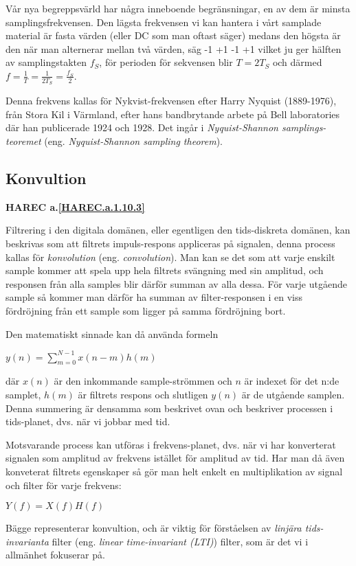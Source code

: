 \begin{rev-nytt}[MAD]

Vår nya begreppsvärld har några inneboende begränsningar, en av dem är minsta
samplingsfrekvensen. Den lägsta frekvensen vi kan hantera i vårt samplade
material är fasta värden (eller DC som man oftast säger) medans den högsta är
den när man alternerar mellan två värden, säg -1 +1 -1 +1 vilket ju ger
hälften av samplingstakten \(f_S\), för perioden för sekvensen blir
\(T = 2T_S\) och därmed \(f=\frac{1}{T}=\frac{1}{2T_S}=\frac{f_S}{2}\).

Denna frekvens kallas för Nykvist-frekvensen efter Harry Nyquist (1889-1976),
från Stora Kil i Värmland, efter hans bandbrytande arbete på Bell laboratories
där han publicerade 1924 och 1928. Det ingår i \emph{Nyquist-Shannon samplings-
teoremet} (eng. \emph{Nyquist-Shannon sampling theorem}).

\end{rev-nytt}

\subsection{Konvultion}
\textbf{HAREC a.\ref{HAREC.a.1.10.3}\label{myHAREC.a.1.10.3}}

\begin{rev-nytt}[MAD]

Filtrering i den digitala domänen, eller egentligen den tids-diskreta domänen,
kan beskrivas som att filtrets impuls-respons appliceras på signalen, denna
process kallas för \emph{konvolution} (eng. \emph{convolution}). Man kan se det
som att varje enskilt sample kommer att spela upp hela filtrets svängning med
sin amplitud, och responsen från alla samples blir därför summan av alla dessa.
För varje utgående sample så kommer man därför ha summan av filter-responsen
i en viss fördröjning från ett sample som ligger på samma fördröjning bort.

Den matematiskt sinnade kan då använda formeln

\(y(n) = \sum_{m=0}^{N-1} x(n-m)h(m)\)

där \(x(n)\) är den inkommande sample-strömmen och \(n\) är indexet för det
n:de samplet, \(h(m)\) är filtrets respons och slutligen \(y(n)\) är de utgående
samplen. Denna summering är densamma som beskrivet ovan och beskriver processen
i tids-planet, dvs. när vi jobbar med tid.

Motsvarande process kan utföras i frekvens-planet, dvs. när vi har konverterat
signalen som amplitud av frekvens istället för amplitud av tid. Har man då
även konveterat filtrets egenskaper så gör man helt enkelt en multiplikation av
signal och filter för varje frekvens:

\(Y(f) = X(f)H(f)\)

Bägge representerar konvultion, och är viktig för förståelsen av \emph{linjära
tids-invarianta} filter (eng. \emph{linear time-invariant (LTI)}) filter,
som är det vi i allmänhet fokuserar på.

\end{rev-nytt}

